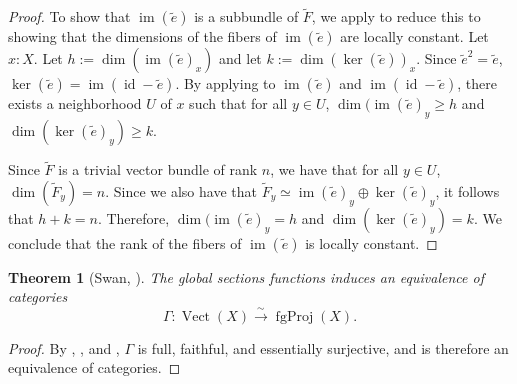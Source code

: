 \documentclass[11pt]{article}
\newcommand{\Vect}{\operatorname{Vect}}
\newcommand{\fgProj}{\operatorname{fgProj}}
\newcommand{\im}{\operatorname{im}}
\renewcommand{\ker}{\operatorname{ker}}
\newcommand{\id}{\operatorname{id}}
\theoremstyle{plain}
\newtheorem{theorem}{Theorem}[section]
\theoremstyle{definition}
\newtheorem{definition}{Definition}[section]
\begin{document}
\begin{proof}
To show that \(\im(\widetilde{e})\) is a subbundle of \(\widetilde{F}\), we apply  to reduce this to showing that the dimensions of the fibers of \(\im(\widetilde{e})\) are locally constant. Let \(x : X\). Let \(h := \dim (\im(\widetilde{e})_x)\) and let \(k := \dim(\ker(\widetilde{e}))_x\). Since \(\widetilde{e}^2 = \widetilde{e}\), \(\ker(\widetilde{e}) = \im(\id - \widetilde{e})\). By applying  to \(\im(\widetilde{e})\) and \(\im(\id - \widetilde{e})\), there exists a neighborhood \(U\) of \(x\) such that for all \(y \in U\), \(\dim(\im(\widetilde{e})_y \geq h\) and \(\dim(\ker(\widetilde{e})_y) \geq k\).

Since \(\widetilde{F}\) is a trivial vector bundle of rank \(n\), we have that for all \(y \in U\), \(\dim(\widetilde{F}_y) = n\). Since we also have that \(\widetilde{F}_y \simeq \im(\widetilde{e})_y \oplus \ker(\widetilde{e})_y\), it follows that \(h + k = n\). Therefore, \(\dim(\im(\widetilde{e})_y = h\) and \(\dim(\ker(\widetilde{e})_y) = k\). We conclude that the rank of the fibers of \(\im(\widetilde{e})\) is locally constant.
\end{proof}

\begin{theorem}[Swan, \cite{swan1962vector}] \label{thm:swan}
  The global sections functions induces an equivalence of categories
  \[\Gamma : \Vect(X) \overset{\sim}{\longrightarrow} \fgProj(X).\]
\end{theorem}

\begin{proof}
  By , , and , \(\Gamma\) is full, faithful, and essentially surjective, and is therefore an equivalence of categories.
\end{proof}



\end{document}

